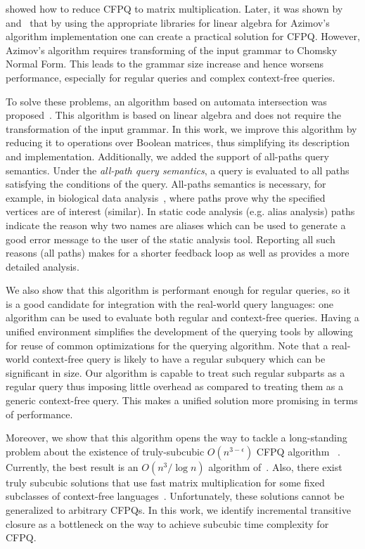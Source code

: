 \cite{Azimov:2018:CPQ:3210259.3210264} showed how to reduce CFPQ to matrix multiplication.
Later, it was shown by~\cite{Mishin:2019:ECP:3327964.3328503} and~\cite{10.1145/3398682.3399163} that by using the appropriate libraries for linear algebra for Azimov's algorithm implementation one can create a practical solution for CFPQ.
However, Azimov's algorithm requires transforming of the input grammar to Chomsky Normal Form.
This leads to the grammar size increase and hence worsens performance, especially for regular queries and complex context-free queries.

To solve these problems, an algorithm based on automata intersection was proposed~\cite{10.1007/978-3-030-54832-2_6}.
This algorithm is based on linear algebra and does not require the transformation of the input grammar.
In this work, we improve this algorithm by reducing it to operations over Boolean matrices, thus simplifying its description and implementation.
Additionally, we added the support of all-paths query semantics.
Under the \textit{all-path query semantics}, a query is evaluated to all paths satisfying the conditions of the query.
All-paths semantics is necessary, for example, in biological data analysis~\cite{GraphQueryWithEarley}, where paths prove why the specified vertices are of interest (similar).
In static code analysis (e.g. alias analysis) paths indicate the reason why two names are aliases which can be used to generate a good error message to the user of the static analysis tool. Reporting all such reasons (all paths) makes for a shorter feedback loop as well as provides a more detailed analysis.

We also show that this algorithm is performant enough for regular queries, so it is a good candidate for integration with the real-world query languages: one algorithm can be used to evaluate both regular and context-free queries.
Having a unified environment simplifies the development of the querying tools by allowing for reuse of common optimizations for the querying algorithm.
Note that a real-world context-free query is likely to have a regular subquery which can be significant in size.
Our algorithm is capable to treat such regular subparts as a regular query thus imposing little overhead as compared to treating them as a generic context-free query.
This makes a unified solution more promising in terms of performance.

Moreover, we show that this algorithm opens the way to tackle a long-standing problem about the existence of truly-subcubic $O(n^{3-\epsilon})$ CFPQ algorithm ~\cite{10.1145/1328438.1328460, Yannakakis}.
Currently, the best result is an $O(n^3/\log{n})$ algorithm of~\cite{10.1145/1328438.1328460}.
Also, there exist truly subcubic solutions that use fast matrix multiplication for some fixed subclasses of context-free languages~\cite{8249039}.
Unfortunately, these solutions cannot be generalized to arbitrary CFPQs.
In this work, we identify incremental transitive closure as a bottleneck on the way to achieve subcubic time complexity for CFPQ.

